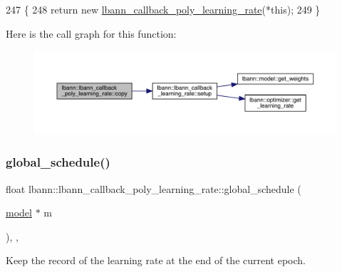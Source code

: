 \begin{DoxyCode}
247                                                            \{
248     \textcolor{keywordflow}{return} \textcolor{keyword}{new} \hyperlink{classlbann_1_1lbann__callback__poly__learning__rate_ac36d25516687e0d0c43b51acae9eb1ff}{lbann\_callback\_poly\_learning\_rate}(*\textcolor{keyword}{this});
249   \}
\end{DoxyCode}
Here is the call graph for this function\+:\nopagebreak
\begin{figure}[H]
\begin{center}
\leavevmode
\includegraphics[width=350pt]{classlbann_1_1lbann__callback__poly__learning__rate_aea01c416903c421cf6dce1a7f320c94b_cgraph}
\end{center}
\end{figure}
\mbox{\label{classlbann_1_1lbann__callback__poly__learning__rate_a6302be36ef16079105b812c7599dac76}} 
\subsubsection{\texorpdfstring{global\+\_\+schedule()}{global\_schedule()}}
{\footnotesize\ttfamily float lbann\+::lbann\+\_\+callback\+\_\+poly\+\_\+learning\+\_\+rate\+::global\+\_\+schedule (\begin{DoxyParamCaption}\item[{\hyperlink{classlbann_1_1model}{model} $\ast$}]{m }\end{DoxyParamCaption})\hspace{0.3cm}{\ttfamily [override]}, {\ttfamily [protected]}, {\ttfamily [virtual]}}

Keep the record of the learning rate at the end of the current epoch. 

